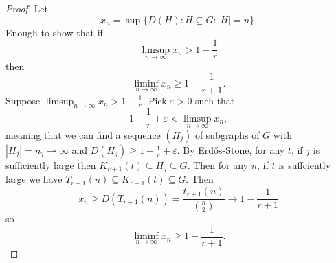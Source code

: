 \documentclass[a4paper]{article}
\begin{document}
\begin{proof}
  Let
  \[
    x_n = \sup \{D(H): H \subseteq G: |H| = n\}.
  \]
  Enough to show that if
  \[
    \limsup_{n \to \infty} x_n > 1 - \frac{1}{r}
  \]
  then
  \[
    \liminf_{n \to \infty} x_n \geq 1 - \frac{1}{r + 1}.
  \]
  Suppose \(\limsup_{n \to \infty} x_n > 1 - \frac{1}{r}\). Pick \(\varepsilon > 0\) such that
  \[
    1 - \frac{1}{r} + \varepsilon < \limsup_{n \to \infty} x_n,
  \]
  meaning that we can find a sequence \((H_j)\) of subgraphs of \(G\) with \(|H_j| = n_j \to \infty\) and \(D(H_j) \geq 1 - \frac{1}{r} + \varepsilon\). By Erdős-Stone, for any \(t\), if \(j\) is sufficiently large then \(K_{r + 1}(t) \subseteq H_j \subseteq G\). Then for any \(n\), if \(t\) is suffciently large we have \(T_{r + 1}(n) \subseteq K_{r + 1}(t) \subseteq G\). Then
  \[
    x_n \geq D(T_{r + 1}(n)) = \frac{t_{r + 1}(n)}{\binom{n}{2}} \to 1 - \frac{1}{r + 1}
  \]
  so
  \[
    \liminf_{n \to \infty} x_n \geq 1 - \frac{1}{r + 1}.
  \]
\end{proof}
\end{document}
